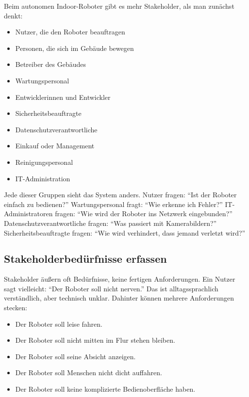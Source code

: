 Beim autonomen Indoor-Roboter gibt es mehr Stakeholder, als man zunächst denkt:

\begin{itemize}
    \item Nutzer, die den Roboter beauftragen
    \item Personen, die sich im Gebäude bewegen
    \item Betreiber des Gebäudes
    \item Wartungspersonal
    \item Entwicklerinnen und Entwickler
    \item Sicherheitsbeauftragte
    \item Datenschutzverantwortliche
    \item Einkauf oder Management
    \item Reinigungspersonal
    \item IT-Administration
\end{itemize}

Jede dieser Gruppen sieht das System anders. Nutzer fragen: \enquote{Ist der Roboter einfach zu bedienen?} Wartungspersonal fragt: \enquote{Wie erkenne ich Fehler?} IT-Administratoren fragen: \enquote{Wie wird der Roboter ins Netzwerk eingebunden?} Datenschutzverantwortliche fragen: \enquote{Was passiert mit Kamerabildern?} Sicherheitsbeauftragte fragen: \enquote{Wie wird verhindert, dass jemand verletzt wird?}

\subsection{Stakeholderbedürfnisse erfassen}
Stakeholder äußern oft Bedürfnisse, keine fertigen Anforderungen. Ein Nutzer sagt vielleicht: \enquote{Der Roboter soll nicht nerven.} Das ist alltagssprachlich verständlich, aber technisch unklar. Dahinter können mehrere Anforderungen stecken:

\begin{itemize}
    \item Der Roboter soll leise fahren.
    \item Der Roboter soll nicht mitten im Flur stehen bleiben.
    \item Der Roboter soll seine Absicht anzeigen.
    \item Der Roboter soll Menschen nicht dicht auffahren.
    \item Der Roboter soll keine komplizierte Bedienoberfläche haben.
\end{itemize}

